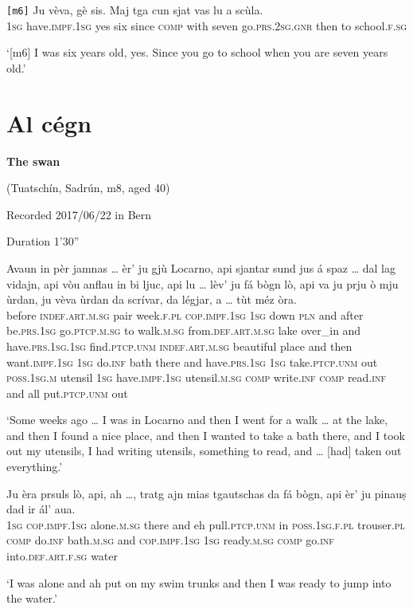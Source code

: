 \begin{linenumbers}
	\gll    \texttt{[m6]} Ju vèva, gè sis. Maj tga cun sjat vas lu a scùla.\\
	{} \textsc{1sg}  have.\textsc{impf.1sg} yes six since  \textsc{comp} with seven go.\textsc{prs.2sg.gnr} then to school.\textsc{f.sg}\\
\end{linenumbers}
\medskip
\glt `[m6] I was six years old, yes. Since you go to school when you are seven years old.'
\medskip


\section{Al cégn}
\textbf{The swan}

\noindent
(Tuatschín, Sadrún, m8, aged 40)

\noindent
Recorded 2017/06/22 in Bern

\noindent
Duration 1'30''
\bigskip

\begin{linenumbers}
\gll  Avaun in pèr jamnas … èr’ ju gjù Locarno, api sjantar sund jus á spaz … dal lag vidajn, api vòu anflau in bi ljuc, api lu … lèv’ ju fá bògn lò, api va ju prju ò mju ùrdan, ju vèva ùrdan da scrívar, da légjar, a … tùt méz òra.\\
before \textsc{indef.art.m.sg} pair week.\textsc{f.pl} {} \textsc{cop.impf.1sg} \textsc{1sg} down \textsc{pln} and after be.\textsc{prs.1sg} go.\textsc{ptcp.m.sg} to walk.\textsc{m.sg} {} from.\textsc{def.art.m.sg} lake over\_in and have.\textsc{prs.1sg.1sg} find.\textsc{ptcp.unm} \textsc{indef.art.m.sg} beautiful place and then {} want.\textsc{impf.1sg} \textsc{1sg} do.\textsc{inf} bath there and have.\textsc{prs.1sg} \textsc{1sg} take.\textsc{ptcp.unm} out \textsc{poss.1sg.m} utensil \textsc{1sg} have.\textsc{impf.1sg} utensil.\textsc{m.sg} \textsc{comp} write.\textsc{inf} \textsc{comp} read.\textsc{inf} and {} all put.\textsc{ptcp.unm} out  \\
\end{linenumbers}
\medskip
\glt `Some weeks ago … I was in Locarno and then I went for a walk … at the lake, and then I found a nice place, and then I wanted to take a bath there, and I took out my utensils, I had writing utensils, something to read, and … [had] taken out everything.'
\medskip

\begin{linenumbers}
\gll  Ju èra prsuls lò, api, ah …, tratg ajn mias tgautschas da fá bògn, api èr’ ju pinauṣ dad ir ál’ aua.  \\
 \textsc{1sg} \textsc{cop.impf.1sg} alone.\textsc{m.sg} there and eh {} pull.\textsc{ptcp.unm} in \textsc{poss.1sg.f.pl} trouser.\textsc{pl} \textsc{comp} do.\textsc{inf} bath.\textsc{m.sg} and \textsc{cop.impf.1sg} \textsc{1sg} ready.\textsc{m.sg} \textsc{comp} go.\textsc{inf} into.\textsc{def.art.f.sg} water\\
\end{linenumbers}
\medskip
\glt `I was alone and ah put on my swim trunks and then I was ready to jump into the water.'
\medskip

